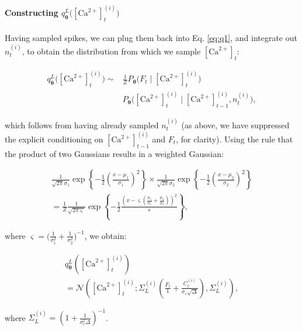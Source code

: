 \documentclass[10pt]{article}
\providecommand{\ve}[1]{\boldsymbol{#1}}
\providecommand{\ve}[1]{\boldsymbol{#1}}
\newcommand{\thetn}{\ve{\theta}}
\newcommand{\p}{P_{\thetn}}
\newcommand{\Ca}{[\text{Ca}^{2+}]}
\begin{document}
\paragraph{Constructing $q_{\thetn}^L\big(\Ca_t^{(i)}\big)$}

Having sampled spikes, we can plug them back into Eq. \ref{eq:q1}, and integrate out $n_t^{(i)}$, to obtain the distribution from which we sample $\Ca_t$:

\begin{align} \label{eq:q_C}
q_{\thetn}^L\big(\Ca_t^{(i)}\big) \sim& \frac{1}{Z} \p\big(F_t \mid \Ca_t^{(i)}\big) \nonumber \\
&\p\big(\Ca_t^{(i)} \mid \Ca_{t-1}^{(i)}, n_t^{(i)}\big),
\end{align} 

\noindent which follows from having already sampled $n_t^{(i)}$ (as above, we have suppressed the explicit conditioning on $\Ca_{t-1}^{(i)}$ and $F_t$, for clarity). Using the rule that the product of two Gaussians results in a weighted Gaussian:

\begin{multline} \label{eq:prod_gauss}
\frac{1}{\sqrt{2 \pi} \sigma_1} \exp\left\{-\frac{1}{2} \left(\frac{x-\mu_1}{\sigma_1}\right)^2\right\} \times \frac{1}{\sqrt{2 \pi} \sigma_2} \exp\left\{-\frac{1}{2} \left(\frac{x-\mu_2}{\sigma_2}\right)^2\right\} \\
= \frac{1}{Z} \frac{1}{\sqrt{2 \pi \varsigma}} \exp \left\{-\frac{1}{2} \frac{\left(x - \varsigma \left(\frac{\mu_1}{\sigma_1} + \frac{\mu_2}{\sigma_2}\right)\right)^2}{s}\right\}, 
\end{multline}

\noindent where $\varsigma=\big(\frac{1}{\sigma_1^2}+\frac{1}{\sigma_2^2}\big)^{-1}$, we obtain:

\begin{multline}
q_{\thetn}^L(\Ca_t^{(i)}) \\= \mathcal{N}\left(\Ca_t^{(i)}; \Sigma_L^{(i)} \left(\frac{F_t}{1} + \frac{C_t^{(i)}}{\sigma_c \sqrt{\Delta}}\right),\Sigma_L^{(i)} \right),
\end{multline}

\noindent where  $\Sigma_L^{(i)}=\left(1+\frac{1}{\sigma_c^2 \Delta}\right)^{-1}$. %
\end{document}
